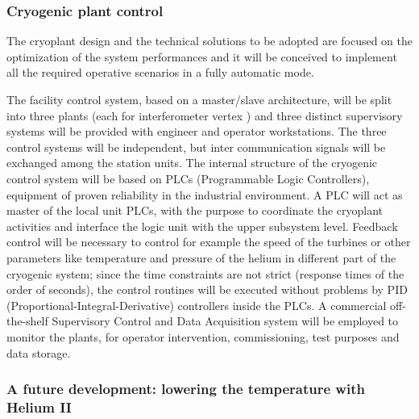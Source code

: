 \FloatBarrier

\subsubsection{Cryogenic plant control}
\label{sec:cryo_comtrol}

The cryoplant design and the technical solutions to be adopted are focused on the optimization of  the system performances and it will be conceived  to implement all the required operative scenarios in a fully automatic mode.

The facility control system, based on a master/slave architecture,   will be split into three plants (each for interferometer vertex ) and three distinct supervisory systems will be  provided with engineer and operator workstations. The three control systems will be  independent, but inter communication signals will be exchanged among the station units.
The internal structure of the cryogenic control system will be based on PLCs (Programmable Logic Controllers), equipment of proven reliability in the industrial environment. A PLC will act as master of the local unit PLCs, with the purpose to coordinate the cryoplant activities and interface the logic unit with the upper subsystem level. Feedback control will be necessary to control for example the speed of the turbines or other parameters like temperature and pressure of the helium in different part of the cryogenic system; since the time constraints are not strict (response times of the order of seconds), the control routines will be executed without problems by PID (Proportional-Integral-Derivative) controllers inside the PLCs. A commercial off-the-shelf Supervisory Control and Data Acquisition system will be employed to monitor the plants, for operator intervention, commissioning, test purposes and data storage.


\FloatBarrier
 \subsubsection{A  future development: lowering the temperature  with Helium II}
\label{sec:Helium_II}

